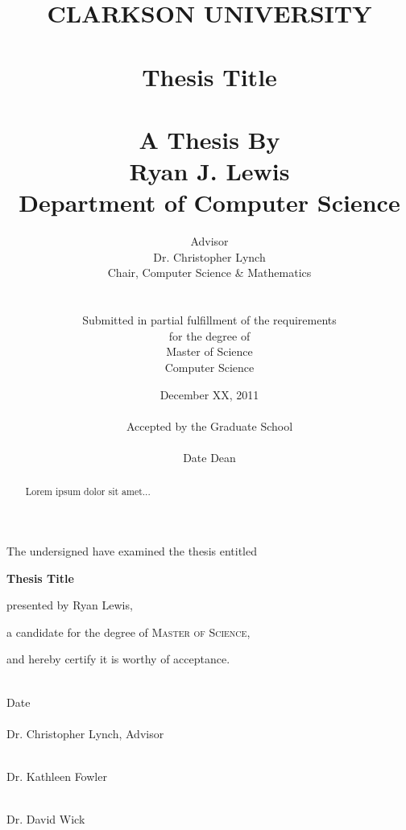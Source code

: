 \documentclass[letterpaper,12pt]{report}
\title{CLARKSON UNIVERSITY \\
\ \\
Thesis Title \\ 
\ \\
\large{A Thesis By \\
\textbf{Ryan J. Lewis} \\
Department of Computer Science \\
}}
\author{Advisor \\
Dr. 	Christopher Lynch \\
Chair, Computer Science \& Mathematics \\
\ \\ \\
Submitted in partial fulfillment of the requirements \\
for the degree of \\
Master of Science \\
Computer Science}
\date{December XX, 2011 \\
\ \\
Accepted by the Graduate School \\
\vspace{.5in}
\hrulefill \\
Date \hspace{2in} Dean
}
\begin{document}
\maketitle

\newpage
\thispagestyle{empty}
\begin{center}
The undersigned have examined the thesis entitled

\vspace{0.4in}

\textbf{Thesis Title}

\vspace{0.4in}

presented by Ryan Lewis,

\vspace{0.4in}

a candidate for the degree of \textsc{Master of Science},

\vspace{0.4in}

and hereby certify it is worthy of acceptance.

\vspace{0.5in}
\hrulefill \\

Date \\
\vspace{0.5in}
\hrulefill \\
\hfill Dr. Christopher Lynch, Advisor

\vspace{0.5in}
\hrulefill \\
\hfill Dr. Kathleen Fowler

\vspace{0.5in}
\hrulefill \\
\hfill Dr. David Wick
\end{center}

\begin{abstract}
Lorem ipsum dolor sit amet...
\end{abstract}

\cleardoublepage


\tableofcontents

\cleardoublepage


\doublespacing







\singlespacing

\raggedright



\doublespacing

\begin{appendices}

\end{appendices}
\end{document}
